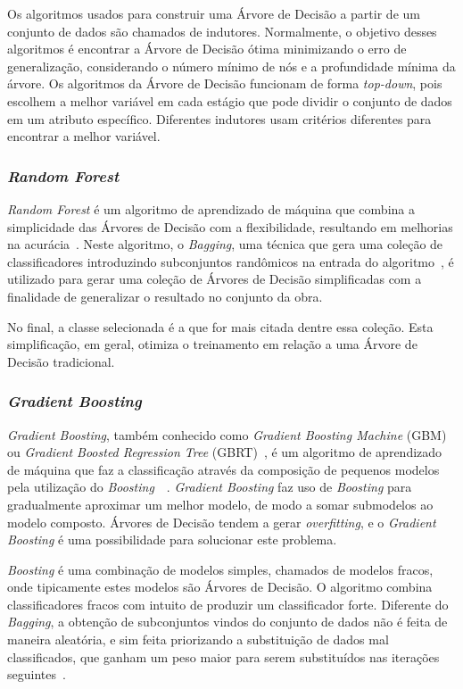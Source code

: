 \documentclass[portugues]{ic-tese}
\begin{document}
Os algoritmos usados para construir uma Árvore de Decisão a partir de um conjunto de dados são chamados de indutores. Normalmente, o objetivo desses algoritmos é encontrar a Árvore de Decisão ótima minimizando o erro de generalização, considerando o número mínimo de nós e a profundidade mínima da árvore. Os algoritmos da Árvore de Decisão funcionam de forma \textit{top-down}, pois escolhem a melhor variável em cada estágio que pode dividir o conjunto de dados em um atributo específico. Diferentes indutores usam critérios diferentes para encontrar a melhor variável.

\subsubsection{\textit{Random Forest}}

\textit{Random Forest} é um algoritmo de aprendizado de máquina que combina a simplicidade das Árvores de Decisão com a flexibilidade, resultando em melhorias na acurácia~\citep{Breiman_2001}. Neste algoritmo, o \textit{Bagging}, uma técnica que gera uma coleção de classificadores introduzindo subconjuntos randômicos na entrada do algoritmo~\citep{Witten_2016}, é utilizado para gerar uma coleção de Árvores de Decisão simplificadas com a finalidade de generalizar o resultado no conjunto da obra.

No final, a classe selecionada é a que for mais citada dentre essa coleção. Esta simplificação, em geral, otimiza o treinamento em relação a uma Árvore de Decisão tradicional.

\subsubsection{\textit{Gradient Boosting}}

\textit{Gradient Boosting}, também conhecido como \textit{Gradient Boosting Machine} (GBM) ou \textit{Gradient Boosted Regression Tree} (GBRT)~\citep{Chen_2016}, é um algoritmo de aprendizado de máquina que faz a classificação através da composição de pequenos modelos pela utilização do \textit{Boosting}~\citep{Friedman_2000}~\citep{Hastie_2009}. \textit{Gradient Boosting} faz uso de \textit{Boosting} para gradualmente aproximar um melhor modelo, de modo a somar submodelos ao modelo composto. Árvores de Decisão tendem a gerar \textit{overfitting}, e o \textit{Gradient Boosting} é uma possibilidade para solucionar este problema.

\textit{Boosting} é uma combinação de modelos simples, chamados de modelos fracos, onde tipicamente estes modelos são Árvores de Decisão. O algoritmo combina classificadores fracos com intuito de produzir um classificador forte. Diferente do \textit{Bagging}, a obtenção de subconjuntos vindos do conjunto de dados não é feita de maneira aleatória, e sim feita priorizando a substituição de dados mal classificados, que ganham um peso maior para serem substituídos nas iterações seguintes~\citep{Hastie_2009}.
\end{document}
